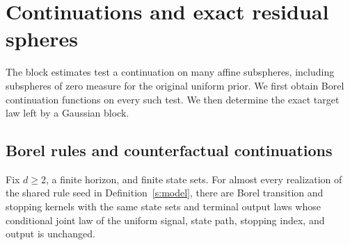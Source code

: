 \section{Continuations and exact residual spheres}\label{s:residual-spheres}

The block estimates test a continuation on many affine subspheres,
including subspheres of zero measure for the original uniform prior.
We first obtain Borel continuation functions on every such test. We
then determine the exact target law left by a Gaussian block.

\subsection{Borel rules and counterfactual continuations}

\begin{lemma}\label{s:borel}
Fix \(d\ge2\), a finite horizon, and finite state sets. For almost
every realization of the shared rule seed in Definition~\ref{s:model},
there are Borel transition and stopping kernels with the same state
sets and terminal output laws whose conditional joint law of the
uniform signal, state path, stopping index, and output is unchanged.
\end{lemma}
